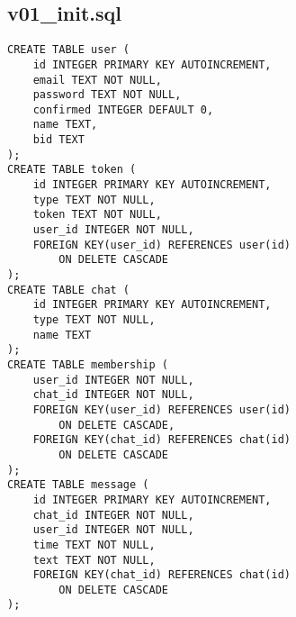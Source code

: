 \documentclass[listing]{espd}
\begin{document}
\subsection{v01\_init.sql}
\begin{verbatim}
CREATE TABLE user (
    id INTEGER PRIMARY KEY AUTOINCREMENT,
    email TEXT NOT NULL,
    password TEXT NOT NULL,
    confirmed INTEGER DEFAULT 0,
    name TEXT,
    bid TEXT
);
CREATE TABLE token (
    id INTEGER PRIMARY KEY AUTOINCREMENT,
    type TEXT NOT NULL,
    token TEXT NOT NULL,
    user_id INTEGER NOT NULL,
    FOREIGN KEY(user_id) REFERENCES user(id)
        ON DELETE CASCADE
);
CREATE TABLE chat (
    id INTEGER PRIMARY KEY AUTOINCREMENT,
    type TEXT NOT NULL,
    name TEXT
);
CREATE TABLE membership (
    user_id INTEGER NOT NULL,
    chat_id INTEGER NOT NULL,
    FOREIGN KEY(user_id) REFERENCES user(id)
        ON DELETE CASCADE,
    FOREIGN KEY(chat_id) REFERENCES chat(id)
        ON DELETE CASCADE
);
CREATE TABLE message (
    id INTEGER PRIMARY KEY AUTOINCREMENT,
    chat_id INTEGER NOT NULL,
    user_id INTEGER NOT NULL,
    time TEXT NOT NULL,
    text TEXT NOT NULL,
    FOREIGN KEY(chat_id) REFERENCES chat(id)
        ON DELETE CASCADE
);
\end{verbatim}



\end{document}
